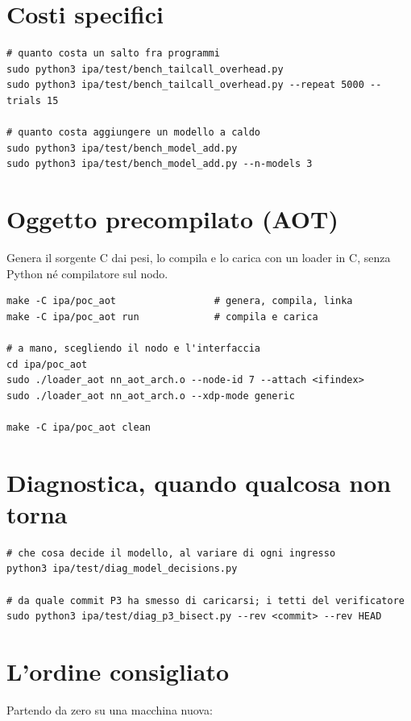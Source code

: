 \documentclass[11pt,a4paper,oneside]{report}
\begin{document}
\section{Costi specifici}

\begin{lstlisting}
# quanto costa un salto fra programmi
sudo python3 ipa/test/bench_tailcall_overhead.py
sudo python3 ipa/test/bench_tailcall_overhead.py --repeat 5000 --trials 15

# quanto costa aggiungere un modello a caldo
sudo python3 ipa/test/bench_model_add.py
sudo python3 ipa/test/bench_model_add.py --n-models 3
\end{lstlisting}

\section{Oggetto precompilato (AOT)}

Genera il sorgente C dai pesi, lo compila e lo carica con un loader in C, senza
Python né compilatore sul nodo.

\begin{lstlisting}
make -C ipa/poc_aot                 # genera, compila, linka
make -C ipa/poc_aot run             # compila e carica

# a mano, scegliendo il nodo e l'interfaccia
cd ipa/poc_aot
sudo ./loader_aot nn_aot_arch.o --node-id 7 --attach <ifindex>
sudo ./loader_aot nn_aot_arch.o --xdp-mode generic

make -C ipa/poc_aot clean
\end{lstlisting}

\section{Diagnostica, quando qualcosa non torna}

\begin{lstlisting}
# che cosa decide il modello, al variare di ogni ingresso
python3 ipa/test/diag_model_decisions.py

# da quale commit P3 ha smesso di caricarsi; i tetti del verificatore
sudo python3 ipa/test/diag_p3_bisect.py --rev <commit> --rev HEAD
\end{lstlisting}

\section{L'ordine consigliato}

Partendo da zero su una macchina nuova:
\end{document}
